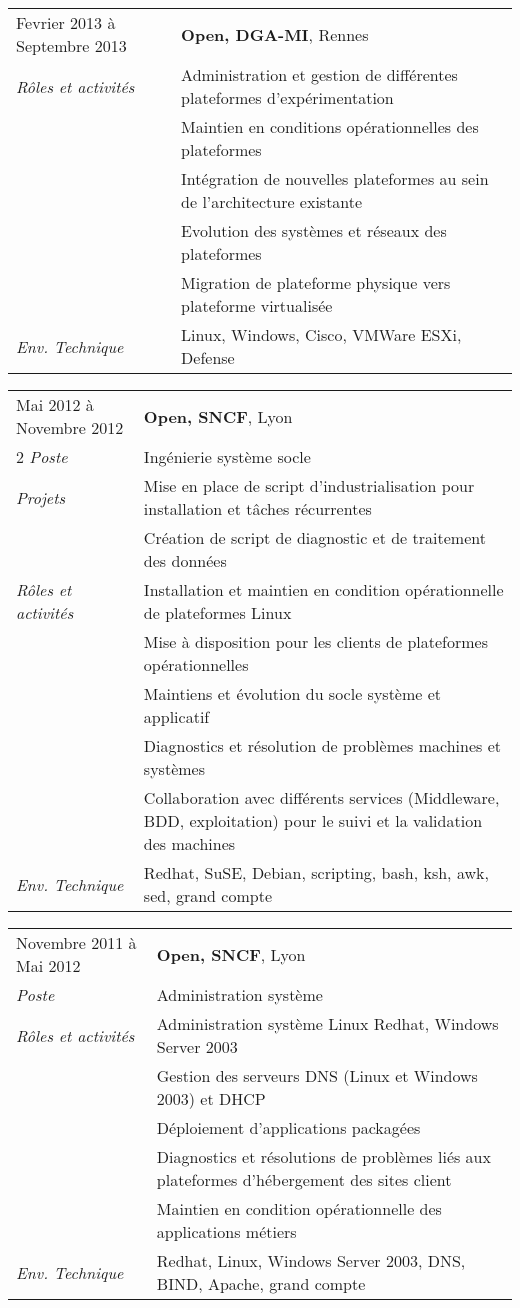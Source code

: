 \documentclass[a4paper,8pt]{article}
\begin{document}
\begin{tabular}{P{3.5cm}|p{13cm}}
Fevrier 2013 à Septembre 2013	& \textbf{Open, DGA-MI}, Rennes\\
\textsl{Rôles et activités}	& Administration et gestion de différentes plateformes d'expérimentation\\
				& Maintien en conditions opérationnelles des plateformes\\
				& Intégration de nouvelles plateformes au sein de l'architecture existante\\
				& Evolution des systèmes et réseaux des plateformes\\
				& Migration de plateforme physique vers plateforme virtualisée\\
\textsl{Env. Technique}		& Linux, Windows, Cisco, VMWare ESXi, Defense\\
\end{tabular}

\begin{tabular}{P{3.5cm}|p{13cm}}
Mai 2012 à Novembre 2012	& \textbf{Open, SNCF}, Lyon\\2
\textsl{Poste}			& Ingénierie système socle\\
\textsl{Projets}		& Mise en place de script d'industrialisation pour installation et tâches récurrentes\\
				& Création de script de diagnostic et de traitement des données\\
\textsl{Rôles et activités}	& Installation et maintien en condition opérationnelle de plateformes Linux\\
				& Mise à disposition pour les clients de plateformes opérationnelles\\
				& Maintiens et évolution du socle système et applicatif\\
				& Diagnostics et résolution de problèmes machines et systèmes\\
				& Collaboration avec différents services (Middleware, BDD, exploitation) pour le suivi et la validation des machines\\
\textsl{Env. Technique}		& Redhat, SuSE, Debian, scripting, bash, ksh, awk, sed, grand compte\\
\end{tabular}

\begin{tabular}{P{3.5cm}|p{13cm}}
Novembre 2011 à Mai 2012	& \textbf{Open, SNCF}, Lyon\\
\textsl{Poste}			& Administration système\\
\textsl{Rôles et activités} 	& Administration système Linux Redhat, Windows Server 2003\\
				& Gestion des serveurs DNS (Linux et Windows 2003) et DHCP\\
				& Déploiement d'applications packagées\\
				& Diagnostics et résolutions de problèmes liés aux plateformes d'hébergement des sites client\\
				& Maintien en condition opérationnelle des applications métiers\\
\textsl{Env. Technique}		& Redhat, Linux, Windows Server 2003, DNS, BIND, Apache, grand compte\\
\end{tabular}
\end{document}
